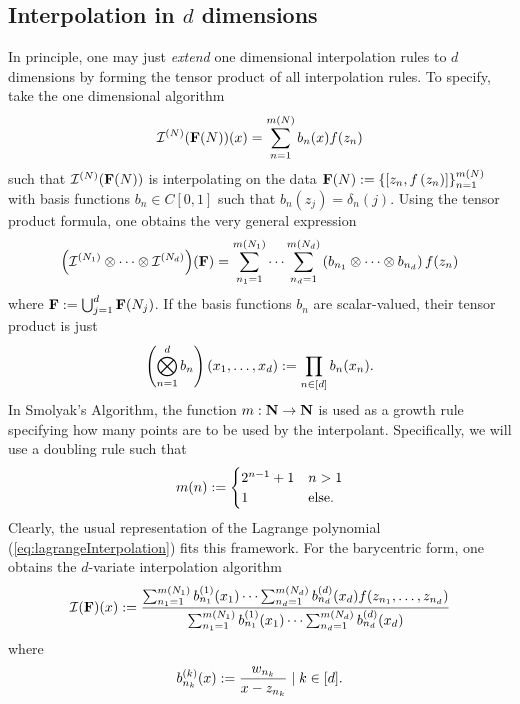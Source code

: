 \documentclass[12pt, oneside]{amsart}
\theoremstyle{definition}
\theoremstyle{remark}
\numberwithin{equation}{section}
\begin{document}
\subsection*{Interpolation in \(d\) dimensions} In principle, one may just \emph{extend} one dimensional interpolation rules to \(d\) dimensions by forming the tensor product of all interpolation rules. To specify, take the one dimensional algorithm
\begin{equation}\label{eq:general1dInterpolation}
    \mathcal{I}^{(N)}(\mathbf{F}(N))(x) = \sum_{n = 1}^{m(N)} b_{n}(x) f(z_n)
\end{equation}
such that \(\mathcal{I}^{(N)}(\mathbf{F}(N))\) is interpolating on the data \(\mathbf{F}(N) := \left\{\left[z_n, f\left(z_n\right)\right]\right\}_{n=1}^{m(N)}\) with basis functions \(b_n \in C[0, 1]\) such that \(b_n(z_j) = \delta_n(j)\). Using the tensor product formula, one obtains the very general expression
\begin{equation}\label{eq:tensorProdInterp}
    {\left( \mathcal{I}^{(N_1)} \otimes \cdots \otimes \mathcal{I}^{(N_d)} \right)}(\mathbf{F})
    = \sum_{n_1 = 1}^{m(N_1)} \cdots \sum_{n_d = 1}^{m(N_d)} \left( b_{n_1} \otimes \cdots \otimes b_{n_d} \right) f(z_{n})
\end{equation}
where \(\mathbf{F} := \bigcup_{j=1}^d \mathbf{F}(N_j)\). If the basis functions \(b_n\) are scalar-valued, their tensor product is just
\begin{equation}\label{eq:tensorProdFunc}
    \left( \bigotimes_{n=1}^d b_n \right)(x_1, \dots, x_d) := \prod_{n \in [d]} b_n(x_n).
\end{equation}
In Smolyak's Algorithm, the function \(m: \mathbf{N} \to \mathbf{N}\) is used as a growth rule specifying how many points are to be used by the interpolant. Specifically, we will use a doubling rule such that \[
    m(n) := \begin{cases}
        2^{n-1}+1 &n > 1\\
        1 &\text{else}.
    \end{cases}
\]
Clearly, the usual representation of the Lagrange polynomial (\ref{eq:lagrangeInterpolation}) fits this framework. For the barycentric form, one obtains the \(d\)-variate interpolation algorithm
\begin{equation}\label{eq:multivarBarycentric}
    \mathcal{I}(\mathbf{F})(x) := \frac{\sum_{n_1=1}^{m(N_1)} b^{(1)}_{n_1}(x_1) \cdots \sum_{n_d=1}^{m(N_d)}b^{(d)}_{n_d}(x_d) f(z_{n_1}, \dots, z_{n_d})}{\sum_{n_1=1}^{m(N_1)} b^{(1)}_{n_1}(x_1) \cdots \sum_{n_d=1}^{m(N_d)}b^{(d)}_{n_d}(x_d)}
\end{equation}
where
\begin{equation}\label{eq:barycentricBasis}
    b^{(k)}_{n_k}(x) := \frac{w_{n_k}}{x-z_{n_k}} \mid k \in [d].
\end{equation}
\end{document}
